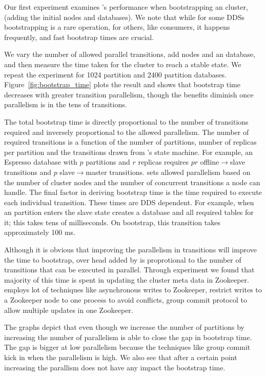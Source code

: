 Our first experiment examines \helix's performance when bootstrapping an \ES cluster,
(\ie adding the initial nodes and databases).  We note that while for some DDSs
bootstrapping is a rare operation, for others, like \databus consumers, it
happens frequently, and fast bootstrap times are crucial.

We vary the number of allowed parallel transitions, add nodes and an \ES
database, and then measure the time taken for the cluster to reach a stable
state.  We repeat the experiment for 1024 partition and 2400 partition
databases. 
Figure~\ref{fig:bootstrap_time} plots the result and shows that bootstrap time
decreases with greater transition parallelism, though the benefits diminish once
parallelism is in the tens of transitions.

The total bootstrap time is directly proportional to the number of transitions
required and inversely proportional to the allowed parallelism.  The number of
required transitions is a function of the number of partitions, number of
replicas per partition and the transitions drawn from \ES's state machine.
For example, an Espresso database with $p$ partitions and $r$ replicas requires
$pr$ offline$\rightarrow$slave transitions and $p$ slave$\rightarrow$master
transitions.  \ES sets allowed parallelism based on the number of cluster nodes
and the number of concurrent transitions a node can handle.
The final factor in deriving bootstrap time is the time required to execute each
individual transition.  These times are DDS dependent. 
For example, when an \ES partition enters the slave state \ES creates a \mysql
database and all required tables for it; this takes tens of milliseconds.
On bootstrap, this transition takes approximately 100 ms.  

Although it is obvious that improving the parallelism in transitions will
improve the time to bootstrap, over head added by \helix is proprotional to the
number of transitions that can be executed in parallel. Through experiment we
found that majority of this time is spent in updating the cluster meta data in
Zookeeper. \helix employs lot of techniques like asynchronous writes to
Zookeeper, restrict writes to a Zookeeper node to one process to avoid
conflicts, group commit protocol to allow multiple updates in one Zookeeper.

The graphs depict that even though we increase the number of partitions by
increasing the number of parallelism \helix is able to close the gap in
bootstrap time. The gap is bigger at low parallelism because the techniques like
group commit kick in when the parallelism is high. We also see that after a
certain point increasing the parallism does not have any impact the bootstrap
time.

